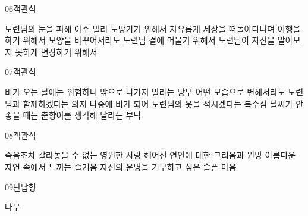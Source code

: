 \documentclass[fs95,seriesFre]{korfarm-base}
\begin{document}
\begin{kfQBlock}{06}{객관식}
\begin{kfChoices}
\kfChoice 도련님의 눈을 피해 아주 멀리 도망가기 위해서
\kfChoice 자유롭게 세상을 떠돌아다니며 여행을 하기 위해서
\kfChoice 모양을 바꾸어서라도 도련님 곁에 머물기 위해서
\kfChoice 도련님이 자신을 알아보지 못하게 변장하기 위해서
\end{kfChoices}
\end{kfQBlock}
\begin{kfQBlock}{07}{객관식}
\begin{kfChoices}
\kfChoice 비가 오는 날에는 위험하니 밖으로 나가지 말라는 당부
\kfChoice 어떤 모습으로 변해서라도 도련님과 함께하겠다는 의지
\kfChoice 나중에 비가 되어 도련님의 옷을 적시겠다는 복수심
\kfChoice 날씨가 안 좋을 때는 춘향이를 생각해 달라는 부탁
\end{kfChoices}
\end{kfQBlock}
\begin{kfQBlock}{08}{객관식}
\begin{kfChoices}
\kfChoice 죽음조차 갈라놓을 수 없는 영원한 사랑
\kfChoice 헤어진 연인에 대한 그리움과 원망
\kfChoice 아름다운 자연 속에서 느끼는 즐거움
\kfChoice 자신의 운명을 거부하고 싶은 슬픈 마음
\end{kfChoices}
\end{kfQBlock}
\begin{kfQBlock}{09}{단답형}
\begin{kfEvidence}나무\end{kfEvidence}
\end{kfQBlock}


\end{document}

